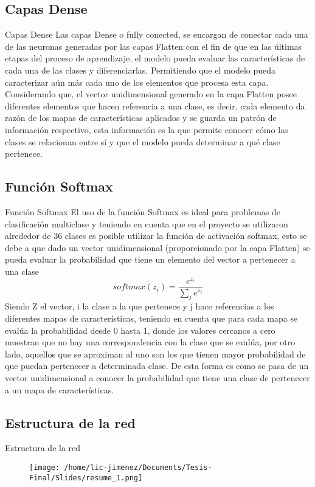 \documentclass{beamer}
\begin{document}
\subsection{Capas Dense}
\begin{frame}{Capas Dense}
    Las capas Dense o fully conected, se encargan de conectar cada una de las neuronas generadas por las capas Flatten con el fin de que en las últimas etapas del proceso de aprendizaje, el modelo pueda evaluar las características de cada una de las clases y diferenciarlas. Permitiendo que el modelo pueda caracterizar aún más cada uno de los elementos que procesa esta capa. Considerando que, el vector unidimensional generado en la capa Flatten posee diferentes elementos que hacen referencia a una clase, es decir, cada elemento da razón de los mapas de características aplicados y se guarda un patrón de información respectivo, esta información es la que permite conocer cómo las clases se relacionan entre sí y que el modelo pueda determinar a qué clase pertenece.     
\end{frame}



\subsection{Función Softmax}
\begin{frame}{Función Softmax}  
   El uso de la función Softmax es ideal para problemas de clasificación multiclase y teniendo en cuenta que en el proyecto se utilizaron alrededor de 36 clases es posible utilizar la función de activación softmax, esto se debe a que dado un vector unidimensional (proporcionado por la capa Flatten) se pueda evaluar la probabilidad que tiene un elemento del vector a pertenecer a una clase
    \[
   softmax(z_i) = \frac{e^{z_i}}{\sum_j e^{z_j}}
    \]
    Siendo Z el vector, i la clase a la que pertenece y j hace referencias a los diferentes mapas de características, teniendo en cuenta que para cada mapa se evalúa la probabilidad desde 0 hasta 1, donde los valores cercanos a cero muestran que no hay una correspondencia con la clase que se evalúa, por otro lado, aquellos que se aproximan al uno son los que tienen mayor probabilidad de que puedan pertenecer a determinada clase. De esta forma es como se pasa de un vector unidimensional a conocer la probabilidad que tiene una clase de pertenecer a un mapa de características.
    
\end{frame}


\subsection{Estructura de la red}
\begin{frame}{Estructura de la red}
    \begin{figure}
        \centering
        \texttt{[image: /home/lic-jimenez/Documents/Tesis-Final/Slides/resume\_1.png]}
    \end{figure}
\end{frame}
\end{document}
